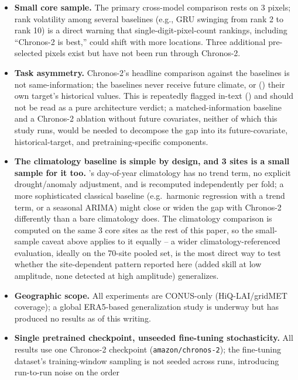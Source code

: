 \documentclass[11pt]{article}
\begin{document}
\begin{itemize}
  \item \textbf{Small core sample.} The primary cross-model comparison rests on 3 pixels; rank
    volatility among several baselines (e.g., GRU swinging from rank 2 to rank 10) is a direct
    warning that single-digit-pixel-count rankings, including ``Chronos-2 is best,'' could shift
    with more locations. Three additional pre-selected pixels exist but have not been run through
    Chronos-2.
  \item \textbf{Task asymmetry.} Chronos-2's headline comparison against the baselines is not
    same-information; the baselines never receive future climate, or ()
    their own target's historical values. This is repeatedly flagged in-text
    () and should not be read as a pure architecture verdict; a
    matched-information baseline and a Chronos-2 ablation without future covariates, neither of
    which this study runs, would be needed to decompose the gap into its future-covariate,
    historical-target, and pretraining-specific components.
  \item \textbf{The climatology baseline is simple by design, and 3 sites is a small sample for
    it too.} 's day-of-year climatology has no trend term, no
    explicit drought/anomaly adjustment, and is recomputed independently per fold; a more
    sophisticated classical baseline (e.g.\ harmonic regression with a trend term, or a seasonal
    ARIMA) might close or widen the gap with Chronos-2 differently than a bare climatology does.
    The climatology comparison is computed on the same 3 core sites as the rest of this paper, so
    the small-sample caveat above applies to it equally -- a wider climatology-referenced
    evaluation, ideally on the 70-site pooled set, is the most direct way to test whether the
    site-dependent pattern reported here (added skill at low amplitude, none detected at high
    amplitude) generalizes.
  \item \textbf{Geographic scope.} All experiments are CONUS-only (HiQ-LAI/gridMET coverage); a
    global ERA5-based generalization study is underway but has produced no results as of this
    writing.
  \item \textbf{Single pretrained checkpoint, unseeded fine-tuning stochasticity.} All results use
    one Chronos-2 checkpoint (\texttt{amazon/chronos-2}); the fine-tuning dataset's
    training-window sampling is not seeded across runs, introducing run-to-run noise on the order

\end{itemize}
\end{document}
